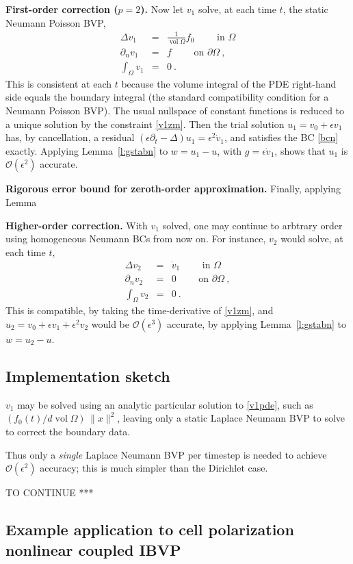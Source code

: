 \documentclass[10pt]{article}
\newcommand{\bea}{\begin{eqnarray}}
\newcommand{\eea}{\end{eqnarray}}
\newcommand{\bigO}{{\mathcal O}}
\DeclareMathOperator{\vol}{vol}
\newcommand{\pO}{{\partial\Omega}}
\newcommand{\eps}{\epsilon}
\newcommand{\dn}{\partial_n}
\newcommand{\dt}{\partial_t}
\begin{document}
{\bf First-order correction ($p=2$).}
Now let $v_1$ solve, at each time $t$, the static Neumann Poisson BVP,
\bea
\Delta v_1 &=& \frac{1}{\vol\Omega} f_0 \qquad \mbox{ in } \Omega
\label{v1pde}
\\
\dn v_1 &=& f \qquad \mbox{ on } \pO~,
\\
\int_\Omega v_1 &=& 0~.
\label{v1zm}
\eea
This is consistent at each $t$ because the volume integral of the PDE
right-hand side equals the boundary integral
(the standard compatibility condition for a Neumann Poisson BVP).
The usual nullspace of constant functions is reduced to a unique solution
by the constraint \eqref{v1zm}.
Then the trial solution
$u_1 = v_0 + \eps v_1$
has, by cancellation, a residual $(\eps \dt -\Delta)u_1 = \eps^2 \dot v_1$,
and satisfies the BC \eqref{bcn} exactly.
Applying Lemma~\ref{l:gstabn} to $w=u_1 -u$, with $g=\eps \dot v_1$,
shows that $u_1$ is $\bigO(\eps^2)$ accurate.

{\bf Rigorous error bound for zeroth-order approximation.}
Finally, applying Lemma~



{\bf Higher-order correction.}
With $v_1$ solved,
one may continue to arbtrary order using homogeneous Neumann BCs
from now on.
For instance, $v_2$ would solve, at each time $t$,
\bea
\Delta v_2 &=& \dot v_1 \qquad \mbox{ in } \Omega
\\
\dn v_2 &=& 0 \qquad \mbox{ on } \pO~,
\\
\int_\Omega v_2 &=& 0~.
\eea
This is compatible, by taking the time-derivative of \eqref{v1zm},
and $u_2=v_0+\eps v_1 + \eps^2 v_2$ would be $\bigO(\eps^3)$
accurate, by applying Lemma~\ref{l:gstabn} to $w = u_2-u$.



\subsection{Implementation sketch}

$v_1$ may be solved using an analytic particular solution to \eqref{v1pde},
such as $(f_0(t)/d \vol\Omega)\,\|x\|^2$, leaving
only a static Laplace Neumann BVP to solve to correct the boundary data.

Thus only a {\em single} Laplace Neumann BVP per timestep is needed
to achieve $\bigO(\eps^2)$ accuracy; this is much simpler than
the Dirichlet case.

TO CONTINUE ***


\subsection{Example application to cell polarization nonlinear coupled IBVP}
\end{document}
